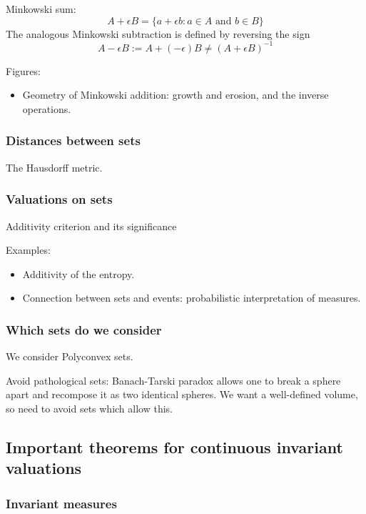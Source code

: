 Minkowski sum:
\begin{equation}
  A + \epsilon B = \{a + \epsilon b : a \in A \textrm{ and } b \in B\}
\end{equation}
The analogous Minkowski subtraction is defined by reversing the sign
\begin{equation}
  A - \epsilon B := A + (-\epsilon) B \ne (A + \epsilon B)^{-1}
\end{equation}

Figures:
\begin{itemize}
\item Geometry of Minkowski addition: growth and erosion, and the inverse operations.
\end{itemize}

\subsubsection{Distances between sets}
The Hausdorff metric.
\subsubsection{Valuations on sets}
Additivity criterion and its significance

Examples:
\begin{itemize}
\item Additivity of the entropy.
\item Connection between sets and events: probabilistic interpretation of measures.
\end{itemize}

\subsubsection{Which sets do we consider}

We consider Polyconvex sets.

Avoid pathological sets: Banach-Tarski paradox allows one to break a sphere apart and recompose it as two identical spheres.
We want a well-defined volume, so need to avoid sets which allow this.

\subsection{Important theorems for continuous invariant valuations}

\subsubsection{Invariant measures}

